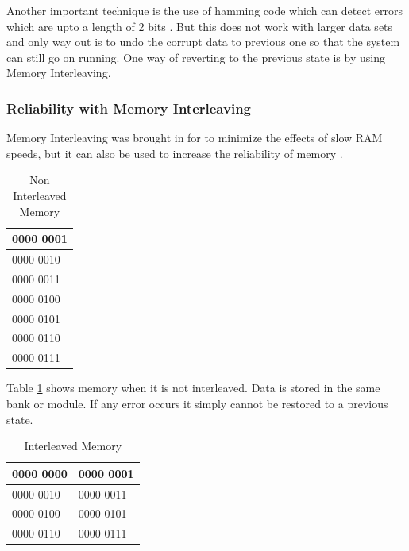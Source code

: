 \documentclass[12pt,a4paper]{article}
\begin{document}
	Another important technique is the use of hamming code which can detect errors which are upto a length of 2 bits \citep{moon2005error}. But this does not work with larger data sets and only way out is to undo the corrupt data to previous one so that the system can still go on running. One way of reverting to the previous state is by using Memory Interleaving\citep{burnett1970study}.	
	
\subsubsection{Reliability with Memory Interleaving}


Memory Interleaving was brought in for to minimize the effects of slow RAM speeds, but it can also be used to increase the reliability of memory \citep{burnett1970study}.\\

\begin{table}[!htb]
	\centering
	\caption{Non Interleaved Memory}
	\label{table:mylabel}
	\begin{tabular}{l}
		\hline
		\multicolumn{1}{|l|}{0000 0001}                   \\ \hline
		\multicolumn{1}{|l|}{0000 0010}                   \\ \hline
		\multicolumn{1}{|l|}{0000 0011}                   \\ \hline
		\multicolumn{1}{|l|}{0000 0100}                   \\ \hline
		\multicolumn{1}{|l|}{0000 0101}                   \\ \hline
		\multicolumn{1}{|l|}{0000 0110}                   \\ \hline
		\multicolumn{1}{|l|}{0000 0111}                   \\ \hline
                                
	\end{tabular}
\end{table}

Table \ref{table:mylabel} shows memory when it is not interleaved. Data is stored in the same bank or module. If any error occurs it simply cannot be restored to a previous state.\\

\begin{table}[!htb]
	\centering
	\caption{Interleaved Memory}
	\label{table:mylabel2}
	\begin{tabular}{|l|l|}
		\hline
		0000 0000 & 0000 0001 \\ \hline
		0000 0010 & 0000 0011        \\ \hline
		0000 0100 & 0000 0101       \\ \hline
		0000 0110 & 0000 0111       \\ \hline
	
	\end{tabular}
\end{table}
\end{document}
